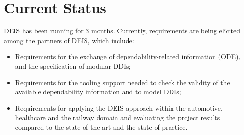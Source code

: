 \section{Current Status}
DEIS has been running for 3 months. Currently, requirements are being elicited among the partners of DEIS, which include:
\begin{itemize}
	\item Requirements for the exchange of dependability-related information (ODE), and the specification of modular DDIs;
	\item Requirements for the tooling support needed to check the validity of the available dependability information and to model DDIs;
	\item Requirements for applying the DEIS approach within the automotive, healthcare and the railway domain and evaluating the project results compared to the state-of-the-art and the state-of-practice.
\end{itemize}